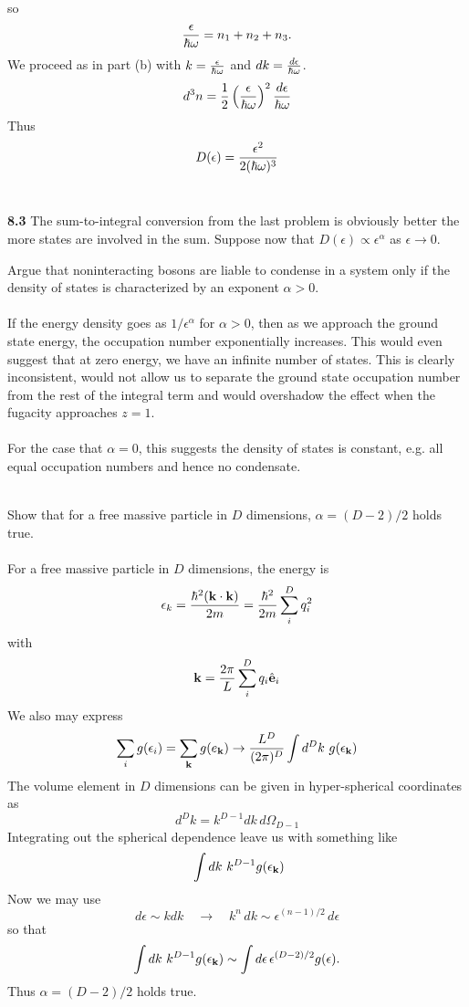 \documentclass[11pt,letterpaper]{article}
\begin{document}
		so
		\[
			\frac{\epsilon}{\hbar\omega} = n_1+n_2+n_3.
		\]
		We proceed as in part (b) with $k = \frac{\epsilon}{\hbar\omega}$ and 
		$dk = \frac{d\epsilon}{\hbar\omega}$. 
		\[
			d^3n = \frac{1}{2}\left(\frac{\epsilon}{\hbar\omega}\right)^2 \frac{d\epsilon}{\hbar\omega}
		\]
		Thus
		\[
			D(\epsilon) = \frac{\epsilon^2}{2(\hbar\omega)^3}
		\] 
		\\
		\eenum
	\item[\textbf{8.3}]
	The sum-to-integral conversion from the last problem is obviously better the more states
	are involved in the sum. Suppose now that $D(\epsilon)\propto \epsilon^\alpha$ as
	$\epsilon\to 0$.
	
	\benum
		\item
            	Argue that noninteracting bosons are liable to condense in a system only if the density
            	of states is characterized by an exponent $\alpha > 0$.
            	\\
		\\
		If the energy density goes as $1/\epsilon^\alpha$ for $\alpha > 0$, then as we approach the 
		ground state energy, the occupation number exponentially increases. This would even suggest 
		that at zero energy, we have an infinite number of states. This is clearly inconsistent, would 
		not allow us to separate the ground state occupation number from the rest of the integral
		term and would overshadow the effect when the fugacity approaches $z=1$.\\ \\ For the
		case that $\alpha = 0$, this suggests the density of states is constant, e.g. all
		equal occupation numbers and hence no condensate. 
		\\
		\\
            	\item
            	Show that for a free massive particle in $D$ dimensions, $\alpha = (D-2)/2$ holds true.
            	\\
		\\
		For a free massive particle in $D$ dimensions, the energy is
		\[
			\epsilon_k = \frac{\hbar^2(\mathbf{k}\cdot\mathbf{k})}{2m} = \frac{\hbar^2}{2m}\sum_i^D q_i^2
		\]
		with
		\[
			\mathbf{k} = \frac{2\pi}{L}\sum_i^D q_i\hat{\mathbf{e}}_i
		\]
		We also may express
		\[
			\sum_i g(\epsilon_i) = \sum_{\vect k} g(e_\vect k) \to \frac{L^D}{(2\pi)^D} \int d^Dk\ 
			g(\epsilon_{\vect k})
		\]
		The volume element in $D$ dimensions can be given in hyper-spherical coordinates as
		\[
			d^Dk = k^{D-1}dk\, d\Omega_{D-1}
		\]
		Integrating out the spherical dependence leave us with something like
		\[
			 ~ \int dk\ k^{D-1} g(\epsilon_{\mathbf{k}})
		\]
		Now we may use
		\[
			d\epsilon \sim k dk\quad\to\quad k^n\, dk \sim \epsilon^{(n-1)/2}\,d\epsilon
		\]
		so that 
		\[
			\int dk\ k^{D-1} g(\epsilon_{\mathbf{k}}) \sim \int d\epsilon\,
			\epsilon^{(D-2)/2} g(\epsilon).
		\]
		Thus $\alpha = (D-2)/2$ holds true. \\
		
\end{document}
